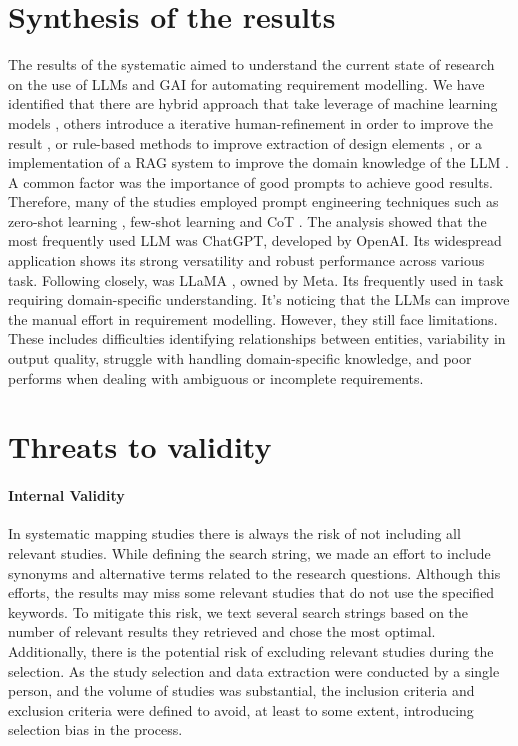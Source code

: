 \section{Synthesis of the results} %
\label{sec:systhesis_of_the_results}
The results of the systematic aimed to understand the current state of research on the use of LLMs and GAI for automating requirement modelling. We have identified that there are hybrid approach that take leverage of machine learning models \cite{2babaalla2024}, others introduce a iterative human-refinement in order to improve the result \cite{7eisenreich2024,3ahmad2023}, or rule-based methods to improve extraction of design elements \cite{4jahan2024}, or a implementation of a RAG system to improve  the domain knowledge of the LLM \cite{13benardi2024}. A common factor was the importance of good prompts to achieve good results. Therefore, many of the studies employed prompt engineering techniques such as zero-shot learning \cite{9ruan2023}, few-shot learning \cite{14chaaben2023} and CoT \cite{10chen2023}. 
The analysis showed that the most frequently used LLM was ChatGPT, developed by OpenAI. Its widespread application shows its  strong versatility and robust performance across various task. Following closely, was LLaMA , owned by Meta. Its frequently used in task requiring domain-specific understanding.
It's noticing that the LLMs can improve the manual effort in requirement modelling. However, they still face limitations. These includes difficulties identifying  relationships between entities, variability in output quality, struggle with  handling domain-specific knowledge, and poor performs when dealing with ambiguous or incomplete requirements.
  
\section{Threats to validity } %
\label{sec:threats_to_validity}

\paragraph{Internal Validity} 
In systematic mapping studies there is always the risk of not including all relevant studies. While defining the search string, we made an effort to include synonyms and alternative terms related to the research questions. Although this efforts, the results may miss some relevant studies that do not use the specified keywords. To mitigate this risk, we text several search strings based on the number of relevant results they retrieved and chose the most optimal.
\\Additionally, there is the potential risk of excluding relevant studies during the selection. As the study selection and data extraction were conducted by a single person, and the volume of studies was substantial, the inclusion criteria and exclusion criteria were defined to avoid, at least to some extent, introducing selection bias in the process.

